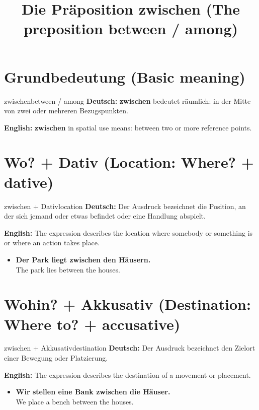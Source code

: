 \documentclass[a4paper,11pt]{article}
\title{Die Präposition zwischen (The preposition between / among)}
\date{}
\newcommand{\GermanText}[1]{\textbf{Deutsch: }#1\par}
\newcommand{\EnglishText}[1]{{\small\color{SoftGray}\textbf{English: }#1\par}}
\newcommand{\ExampleItem}[2]{\item \textbf{#1}\\{\small\color{SoftGray}#2}}
\begin{document}
\maketitle
\tableofcontents
\newpage
\section{Grundbedeutung (Basic meaning)}
\begin{grammarentry}{zwischen}{between / among}
\GermanText{\textbf{zwischen} bedeutet räumlich: in der Mitte von zwei oder mehreren Bezugspunkten.}
\EnglishText{\textbf{zwischen} in spatial use means: between two or more reference points.}
\end{grammarentry}
\section{Wo? + Dativ (Location: Where? + dative)}
\begin{grammarentry}{zwischen + Dativ}{location}
\GermanText{Der Ausdruck bezeichnet die Position, an der sich jemand oder etwas befindet oder eine Handlung abspielt.}
\EnglishText{The expression describes the location where somebody or something is or where an action takes place.}
\end{grammarentry}
\begin{exbox}
\begin{itemize}
\ExampleItem{Der Park liegt zwischen den Häusern.}{The park lies between the houses.}
\end{itemize}
\end{exbox}
\section{Wohin? + Akkusativ (Destination: Where to? + accusative)}
\begin{grammarentry}{zwischen + Akkusativ}{destination}
\GermanText{Der Ausdruck bezeichnet den Zielort einer Bewegung oder Platzierung.}
\EnglishText{The expression describes the destination of a movement or placement.}
\end{grammarentry}
\begin{exbox}
\begin{itemize}
\ExampleItem{Wir stellen eine Bank zwischen die Häuser.}{We place a bench between the houses.}
\end{itemize}
\end{exbox}
\end{document}
